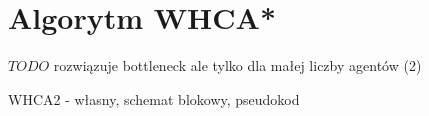\section{Algorytm WHCA*}
\label{ch:alg-whca}

$TODO$ rozwiązuje bottleneck ale tylko dla małej liczby agentów (2)

WHCA2 - własny, schemat blokowy, pseudokod